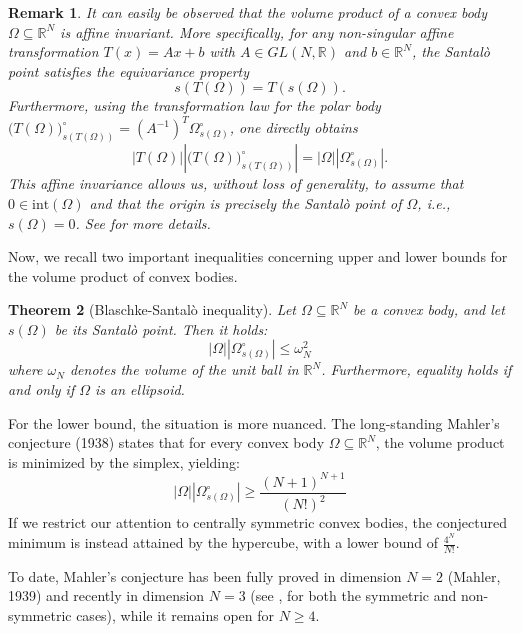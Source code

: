 \documentclass{article}
\newtheorem{theorem}{Theorem}[section]
\newtheorem{remark}[theorem]{Remark}
\numberwithin{equation}{section}
\begin{document}
\noindent \begin{remark}\label{r:affine-invariance}
    It can easily be observed that the volume product of a convex body $\Omega \subseteq \mathbb{R}^N$ is affine invariant. More specifically, for any non-singular affine transformation $T(x) = Ax + b$ with $A \in GL(N, \mathbb{R})$ and $b \in \mathbb{R}^N$, the Santalò point satisfies the equivariance property
\[
s(T(\Omega)) = T(s(\Omega)).
\]
Furthermore, using the transformation law for the polar body $\big(T(\Omega)\big)_{s(T(\Omega))}^\circ = (A^{-1})^T \Omega_{s(\Omega)}^\circ$, one directly obtains
\[
|T(\Omega)| \left|\big(T(\Omega)\big)_{s(T(\Omega))}^\circ\right| = |\Omega| |\Omega_{s(\Omega)}^\circ|.
\]
This affine invariance allows us, without loss of generality, to assume that $0 \in \text{int}(\Omega)$ and that the origin is precisely the Santalò point of $\Omega$, i.e., $s(\Omega) = 0$.
See \cite{schneider2014} for more details.
     \end{remark} 
\noindent Now, we recall two important inequalities concerning upper and lower bounds for the volume product of convex bodies.

\begin{theorem}[Blaschke-Santalò inequality]
    Let $\Omega \subseteq\mathbb{R}^N$ be a convex body, and let $s(\Omega)$ be its Santalò point. Then it holds:
    \begin{equation}
    |\Omega||\Omega^\circ_{s(\Omega)}| \leq \omega_N^2
    \end{equation}
    where $\omega_N$ denotes the volume of the unit ball in $\mathbb{R}^N$. Furthermore, equality holds if and only if $\Omega$ is an ellipsoid.
\end{theorem}

\noindent For the lower bound, the situation is more nuanced. The long-standing Mahler's conjecture (1938) states that for every convex body $\Omega \subseteq \mathbb{R}^N$, the volume product is minimized by the simplex, yielding:
    \begin{equation}
    |\Omega||\Omega^\circ_{s(\Omega)}| \geq \frac{(N+1)^{N+1}}{(N!)^2}
    \end{equation}
If we restrict our attention to centrally symmetric convex bodies, the conjectured minimum is instead attained by the hypercube, with a lower bound of $\frac{4^N}{N!}$. 

\noindent To date, Mahler's conjecture has been fully proved in dimension $N=2$ (Mahler, 1939) and recently in dimension $N=3$ (see \cite{chen2026mahler}, for both the symmetric and non-symmetric cases), while it remains open for $N \geq 4$.
\end{document}
